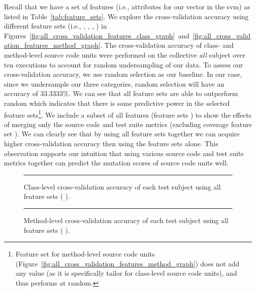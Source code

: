 Recall that we have a set of features (i.e., attributes for our vector in the \gls{svm}) as listed in Table~\ref{tab:feature_sets}. We explore the cross-validation accuracy using different feature sets (i.e., , , , ) in Figures~\ref{fig:all_cross_validation_features_class_graph}~and~\ref{fig:all_cross_validation_features_method_graph}. The cross-validation accuracy of class- and method-level source code units were performed on the collective \emph{all} subject over ten executions to account for random undersampling of our data. To assess our cross-validation accuracy, we use random selection as our baseline. In our case, since we undersample our three categories, random selection will have an accuracy of 33.3333\%. We can see that all feature sets are able to outperform random which indicates that there is some predictive power in the selected feature sets\footnote{Feature set  for method-level source code units (Figure~\ref{fig:all_cross_validation_features_method_graph}) does not add any value (as it is specifically tailor for class-level source code units), and thus performs at random.}. We include a subset of all features (feature sets   ) to show the effects of merging only the source code and test suite metrics (excluding coverage feature set ). We can clearly see that by using all feature sets together we can acquire higher cross-validation accuracy then using the feature sets alone. This observation supports our intuition that using various source code and test suite metrics together can predict the mutation scores of source code units well.

\begin{figure}[!tb]
  \centering
  \begin{adjustbox}{max size={.95\textwidth}{.95\textheight}}
    
  \end{adjustbox}
  \caption{Class-level cross-validation accuracy of each test subject using all feature sets (   ).}
  \vspace{2mm}
  \hrule
  \label{fig:individual_cross_validation_class_1_2_3_4_graph}
\end{figure}

\begin{figure}[!tb]
  \centering
  \begin{adjustbox}{max size={.95\textwidth}{.95\textheight}}
    
  \end{adjustbox}
  \caption{Method-level cross-validation accuracy of each test subject using all feature sets (   ).}
  \vspace{2mm}
  \hrule
  \label{fig:individual_cross_validation_method_1_2_3_4_graph}
\end{figure}

